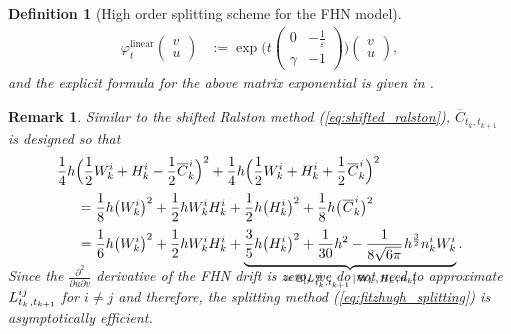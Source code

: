 \documentclass[sn-mathphys-num]{sn-jnl}%
\newtheorem{remark}{Remark}%
\newtheorem{definition}{Definition}%
\newcommand{\E}{\mathbb{E}}
\newcommand{\m}{\hspace{0.25mm}}
\newcommand{\mm}{\hspace{5mm}}
\begin{document}
\begin{definition}[High order splitting scheme for the FHN model]
\begin{align*}
\varphi_t^{\text{linear}}\begin{pmatrix}v\\[3pt] u\end{pmatrix} & := \exp\Bigg(t\begin{pmatrix}0 & -\frac{1}{\varepsilon}\\[3pt] \gamma & -1\end{pmatrix}\Bigg)\begin{pmatrix}v\\[3pt] u\end{pmatrix},
\end{align*}
and the explicit formula for the above matrix exponential is given in \cite[Section 6.2]{buckwar2022splitting}.
\end{definition}\medbreak
\begin{remark}
Similar to the shifted Ralston method (\ref{eq:shifted_ralston}), $\overline{C}_{t_k,t_{k+1}}$ is designed so that\vspace{-2mm}
\begin{align*}
&\frac{1}{4}h\Big(\frac{1}{2} W_k^i + H_k^i - \frac{1}{2}\overline{C}_k^{\m i}\Big)^2 + \frac{1}{4}h\Big(\frac{1}{2} W_k^i + H_k^i + \frac{1}{2}\m\overline{C}_k^{\m i}\Big)^2\\[2pt]
&\mm = \frac{1}{8}h \big(W_k^i\big)^2 + \frac{1}{2}h W_k^i H_k^i + \frac{1}{2}h \big(H_k^i\big)^2 +  \frac{1}{8}h \big(\m\overline{C}_k^{\m i}\big)^2\\[2pt]
&\mm = \frac{1}{6}h \big(W_k^i\big)^2 + \frac{1}{2}h W_k^i H_k^i + \underbrace{\frac{3}{5}h  \big(H_k^i\big)^2  + \frac{1}{30}h^2 - \frac{1}{8\sqrt{6\pi}}\m h^\frac{3}{2} n_k^i W_k^i}_{=\,\, \E[\m L_{t_k,t_{k+1}}^{ii}\,|\, W_k\m,\m H_k\m,\m n_k]}.\\[-24pt]
\end{align*}
Since the $\frac{\partial^2}{\partial u\partial v}$ derivative of the FHN drift is zero, we do not need to approximate\vspace{0.5mm} $L_{t_k\m, t_{k+1}}^{ij}$ for $i\neq j$ and therefore, the splitting method (\ref{eq:fitzhugh_splitting}) is asymptotically efficient.
\end{remark}\bigbreak
\end{document}
